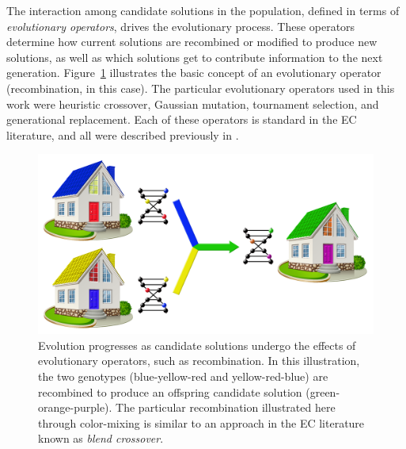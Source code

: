 \documentclass[preprint, review, 12pt]{elsarticle}
\begin{document}
The interaction among candidate solutions in the population, defined in terms of \emph{evolutionary operators}, drives the evolutionary process. These operators determine how current solutions are recombined or modified to produce new solutions, as well as which solutions get to contribute information to the next generation. Figure~\ref{fig:crossover} illustrates the basic concept of an evolutionary operator (recombination, in this case). The particular evolutionary operators used in this work were heuristic crossover, Gaussian mutation, tournament selection, and generational replacement. Each of these operators is standard in the EC literature, and all were described previously in \cite{cit:garrett2013}.

\begin{figure}[htbp]
\centering
\includegraphics[width=5in]{graphics/autotune_crossover}
\caption{Evolution progresses as candidate solutions undergo the effects of evolutionary operators, such as recombination. In this illustration, the two genotypes (blue-yellow-red and yellow-red-blue) are recombined to produce an offspring candidate solution (green-orange-purple). The particular recombination illustrated here through color-mixing is similar to an approach in the EC literature known as \emph{blend crossover}.}
\label{fig:crossover}
\end{figure}
\end{document}
